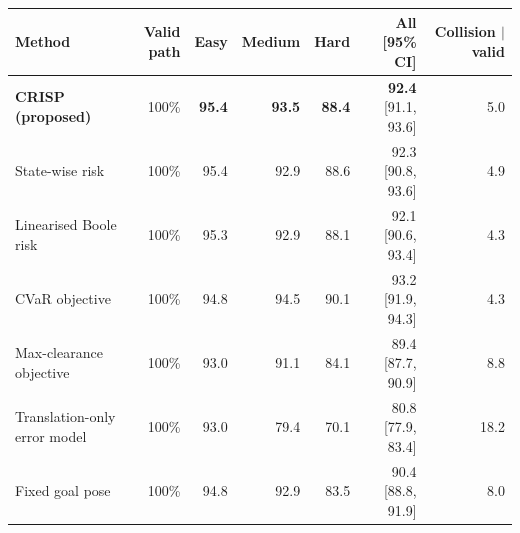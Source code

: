 \begin{tabular}{lrrrrrr}
\toprule
Method & Valid path & Easy & Medium & Hard & All [95\% CI] & Collision $|$ valid \\
\midrule
\textbf{CRISP (proposed)} & 100\% & \textbf{95.4} & \textbf{93.5} & \textbf{88.4} & \textbf{92.4} [91.1, 93.6] & 5.0 \\
State-wise risk & 100\% & 95.4 & 92.9 & 88.6 & 92.3 [90.8, 93.6] & 4.9 \\
Linearised Boole risk & 100\% & 95.3 & 92.9 & 88.1 & 92.1 [90.6, 93.4] & 4.3 \\
CVaR objective & 100\% & 94.8 & 94.5 & 90.1 & 93.2 [91.9, 94.3] & 4.3 \\
Max-clearance objective & 100\% & 93.0 & 91.1 & 84.1 & 89.4 [87.7, 90.9] & 8.8 \\
Translation-only error model & 100\% & 93.0 & 79.4 & 70.1 & 80.8 [77.9, 83.4] & 18.2 \\
Fixed goal pose & 100\% & 94.8 & 92.9 & 83.5 & 90.4 [88.8, 91.9] & 8.0 \\
\bottomrule
\end{tabular}
